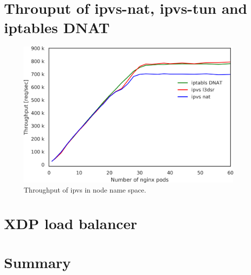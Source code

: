 \FloatBarrier
\section{Throuput of ipvs-nat, ipvs-tun and iptables DNAT}

\begin{figure}[h]
  \centering
  \includegraphics[width=0.8\columnwidth]{Figs/ipvs_node_l3dsr_10g}
  \caption{Throughput of ipvs in node name space.}
  \label{Figs/ipvs_node_l3dsr_10g}
\end{figure}


\FloatBarrier
\section{XDP load balancer}

\section{Summary}




